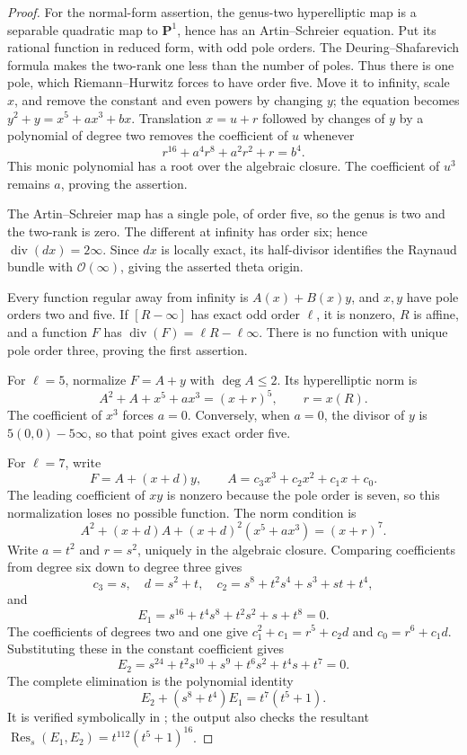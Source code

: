 \documentclass[11pt]{article}
\begin{document}
\begin{proof}
For the normal-form assertion, the genus-two hyperelliptic
map is a separable quadratic map to $\mathbf P^1$, hence
has an Artin--Schreier equation. Put its rational function
in reduced form, with odd pole orders. The
Deuring--Shafarevich formula makes the two-rank one less
than the number of poles. Thus there is one pole, which
Riemann--Hurwitz forces to have order five. Move it to
infinity, scale $x$, and remove the constant and even
powers by changing $y$; the equation becomes
$y^2+y=x^5+a x^3+b x$. Translation $x=u+r$ followed
by changes of $y$ by a polynomial of degree two removes
the coefficient of $u$ whenever
\[
                   r^{16}+a^4r^8+a^2r^2+r=b^4.
\]
This monic polynomial has a root over the algebraic
closure. The coefficient of $u^3$ remains $a$,
proving the assertion.

The Artin--Schreier map has a single pole, of order five,
so the genus is two and the two-rank is zero. The different
at infinity has order six; hence $\operatorname{div}(dx)=2\infty$.
Since $dx$ is locally exact, its half-divisor identifies
the Raynaud bundle with $\mathcal O(\infty)$, giving
the asserted theta origin.

Every function regular away from infinity is
$A(x)+B(x)y$, and $x,y$ have pole orders two and five.
If $[R-\infty]$ has exact odd order $\ell$, it is nonzero,
$R$ is affine, and a function $F$ has
$\operatorname{div}(F)=\ell R-\ell\infty$.
There is no function with unique pole order three, proving
the first assertion.

For $\ell=5$, normalize $F=A+y$ with $\deg A\le2$.
Its hyperelliptic norm is
\[
             A^2+A+x^5+a x^3=(x+r)^5,\qquad r=x(R).
\]
The coefficient of $x^3$ forces $a=0$. Conversely,
when $a=0$, the divisor of $y$ is
$5(0,0)-5\infty$, so that point gives exact order five.

For $\ell=7$, write
\[
 F=A+(x+d)y,\qquad
 A=c_3x^3+c_2x^2+c_1x+c_0.
\]
The leading coefficient of $x y$ is nonzero because the
pole order is seven, so this normalization loses no
possible function. The norm condition is
\[
 A^2+(x+d)A+(x+d)^2(x^5+a x^3)=(x+r)^7.
\]
Write $a=t^2$ and $r=s^2$, uniquely in the algebraic
closure. Comparing coefficients from degree six down to
degree three gives
\[
 c_3=s,\quad d=s^2+t,\quad
 c_2=s^8+t^2s^4+s^3+st+t^4,
\]
and
\[
             E_1=s^{16}+t^4s^8+t^2s^2+s+t^8=0.
\]
The coefficients of degrees two and one give
$c_1^2+c_1=r^5+c_2d$ and $c_0=r^6+c_1d$.
Substituting these in the constant coefficient gives
\[
             E_2=s^{24}+t^2s^{10}+s^9+t^6s^2+t^4s+t^7=0.
\]
The complete elimination is the polynomial identity
\[
                     E_2+(s^8+t^4)E_1=t^7(t^5+1).
\]
It is verified symbolically in
; the output also
checks the resultant
$\operatorname{Res}_s(E_1,E_2)=t^{112}(t^5+1)^{16}$.


\end{proof}
\end{document}
